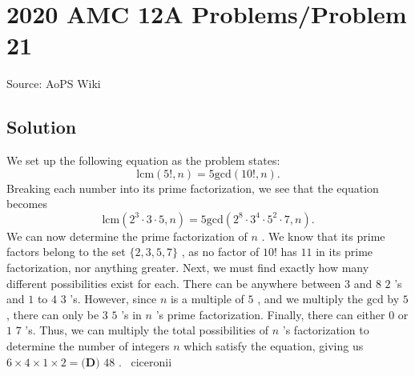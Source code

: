 \documentclass[12pt]{article}
\begin{document}
\section*{{2020 AMC 12A Problems/Problem 21}}
Source: AoPS Wiki

\subsection*{Solution}
We set up the following equation as the problem states: \[\text{lcm}{(5!, n)} = 5\text{gcd}{(10!, n)}.\] Breaking each number into its prime factorization, we see that the equation becomes \[\text{lcm}{(2^3\cdot 3 \cdot 5, n)} = 5\text{gcd}{(2^8\cdot 3^4 \cdot 5^2 \cdot 7, n)}.\] We can now determine the prime factorization of $n$ . We know that its prime factors belong to the set $\{2, 3, 5, 7\}$ , as no factor of $10!$ has $11$ in its prime factorization, nor anything greater. Next, we must find exactly how many different possibilities exist for each. There can be anywhere between $3$ and $8$ $2$ 's and $1$ to $4$ $3$ 's. However, since $n$ is a multiple of $5$ , and we multiply the $\text{gcd}$ by $5$ , there can only be $3$ $5$ 's in $n$ 's prime factorization. Finally, there can either $0$ or $1$ $7$ 's. Thus, we can multiply the total possibilities of $n$ 's factorization to determine the number of integers $n$ which satisfy the equation, giving us $6 \times 4 \times 1 \times 2 = \boxed{\textbf{(D) } 48}$ . ~ciceronii
\end{document}
